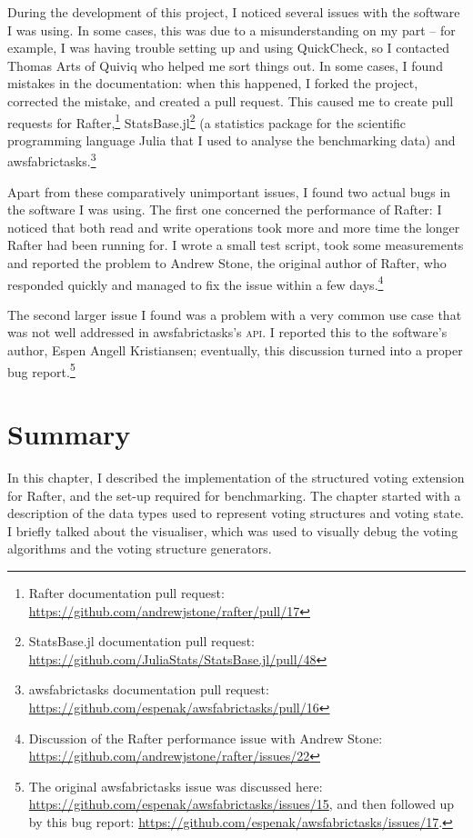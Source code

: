 \documentclass[11pt,chapterprefix=true,toc=bibliography,numbers=noendperiod,
               footnotes=multiple,twoside]{scrreprt}
\begin{document}
During the development of this project, I noticed several issues with the software I was using. In some cases, this was due to a misunderstanding on my part -- for example, I was having trouble setting up and using QuickCheck, so I contacted Thomas Arts of Quiviq who helped me sort things out. In some cases, I found mistakes in the documentation: when this happened, I forked the project, corrected the mistake, and created a pull request. This caused me to create pull requests for Rafter,\footnote{Rafter documentation pull request: \url{https://github.com/andrewjstone/rafter/pull/17}} StatsBase.jl\footnote{StatsBase.jl documentation pull request: \url{https://github.com/JuliaStats/StatsBase.jl/pull/48}} (a statistics package for the scientific programming language Julia that I used to analyse the benchmarking data) and awsfabrictasks.\footnote{awsfabrictasks documentation pull request: \url{https://github.com/espenak/awsfabrictasks/pull/16}}

Apart from these comparatively unimportant issues, I found two actual bugs in the software I was using. The first one concerned the performance of Rafter: I noticed that both read and write operations took more and more time the longer Rafter had been running for. I wrote a small test script, took some measurements and reported the problem to Andrew Stone, the original author of Rafter, who responded quickly and managed to fix the issue within a few days.\footnote{Discussion of the Rafter performance issue with Andrew Stone: \url{https://github.com/andrewjstone/rafter/issues/22}}

The second larger issue I found was a problem with a very common use case that was not well addressed in awsfabrictasks's \textsc{api}. I reported this to the software's author, Espen Angell Kristiansen; eventually, this discussion turned into a proper bug report.\footnote{The original awsfabrictasks issue was discussed here: \url{https://github.com/espenak/awsfabrictasks/issues/15}, and then followed up by this bug report: \url{https://github.com/espenak/awsfabrictasks/issues/17}.}

\section{Summary}

In this chapter, I described the implementation of the structured voting extension for Rafter, and the set-up required for benchmarking. The chapter started with a description of the data types used to represent voting structures and voting state. I briefly talked about the visualiser, which was used to visually debug the voting algorithms and the voting structure generators.
\end{document}
